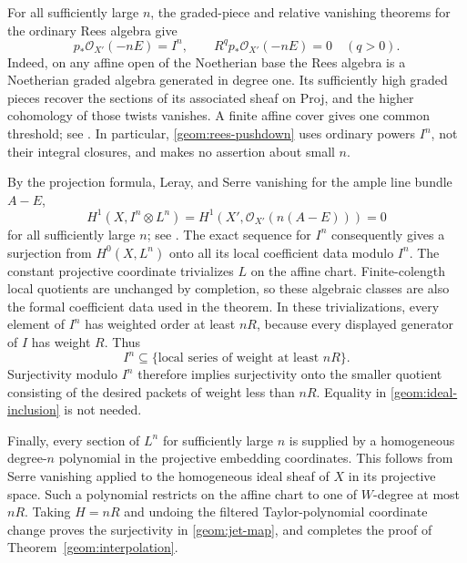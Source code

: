 For all sufficiently large $n$, the graded-piece and relative
vanishing theorems for the ordinary Rees algebra give
\begin{equation}
\label{geom:rees-pushdown}
 p_*\mathcal O_{X'}(-nE)=I^n,\qquad
 R^q p_*\mathcal O_{X'}(-nE)=0\quad(q>0).
\end{equation}
Indeed, on any affine open of the Noetherian base the Rees algebra
is a Noetherian graded algebra generated in degree one. Its
sufficiently high graded pieces recover the sections of its
associated sheaf on Proj, and the higher cohomology of those twists
vanishes. A finite affine cover gives one common threshold;
see \cite[Tags~0AG6 and~0AG7]{stacks}. In particular,
\eqref{geom:rees-pushdown} uses ordinary powers $I^n$, not their
integral closures, and makes no assertion about small $n$.

By the projection formula, Leray, and Serre vanishing for the ample
line bundle $A-E$,
\begin{equation}
\label{geom:serre-vanishing}
 H^1(X,I^n\otimes L^n)
 =H^1(X',\mathcal O_{X'}(n(A-E)))=0
\end{equation}
for all sufficiently large $n$; see \cite[Tag~0B5U]{stacks}.
The exact sequence for $I^n$ consequently gives a surjection from
$H^0(X,L^n)$ onto all its local coefficient data modulo $I^n$.
The constant projective coordinate trivializes $L$ on the affine
chart. Finite-colength local quotients are unchanged by completion,
so these algebraic classes are also the formal coefficient data used
in the theorem. In these trivializations, every element of $I^n$ has
weighted order at least $nR$, because every displayed generator
of $I$ has weight $R$. Thus
\begin{equation}
\label{geom:ideal-inclusion}
 I^n\subseteq\{\text{local series of weight at least }nR\}.
\end{equation}
Surjectivity modulo $I^n$ therefore implies surjectivity onto the
smaller quotient consisting of the desired packets of weight less
than $nR$. Equality in \eqref{geom:ideal-inclusion} is not needed.

Finally, every section of $L^n$ for sufficiently large $n$ is
supplied by a homogeneous degree-$n$ polynomial in the projective
embedding coordinates. This follows from Serre vanishing applied
to the homogeneous ideal sheaf of $X$ in its projective space.
Such a polynomial restricts on the affine chart to one of
$W$-degree at most $nR$. Taking $H=nR$ and undoing the filtered
Taylor-polynomial coordinate change proves the surjectivity in
\eqref{geom:jet-map}, and completes the proof of
Theorem~\ref{geom:interpolation}.
